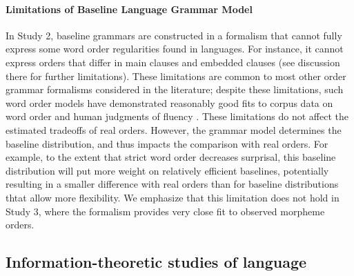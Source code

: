 \paragraph{Limitations of Baseline Language Grammar Model}
In Study 2, baseline grammars are constructed in a formalism that cannot fully express some word order regularities found in languages.
For instance, it cannot express orders that differ in main clauses and embedded clauses (see discussion there for further limitations). %
These limitations are common to most other order grammar formalisms considered in the literature; despite these limitations, such word order models have demonstrated reasonably good fits to corpus data on word order and human judgments of fluency \citep{futrell2015experiments,wang2016galactic}.
These limitations do not affect the estimated tradeoffs of real orders.
However, the grammar model determines the baseline distribution, and thus impacts the comparison with real orders.
For example, to the extent that strict word order decreases surprisal, this baseline distribution will put more weight on relatively efficient baselines, potentially resulting in a smaller difference with real orders than for baseline distributions thtat allow more flexibility.
We emphasize that this limitation does not hold in Study 3, where the formalism provides very close fit to observed morpheme orders.




\subsection{Information-theoretic studies of language}\label{sec:disc:infotheory}

